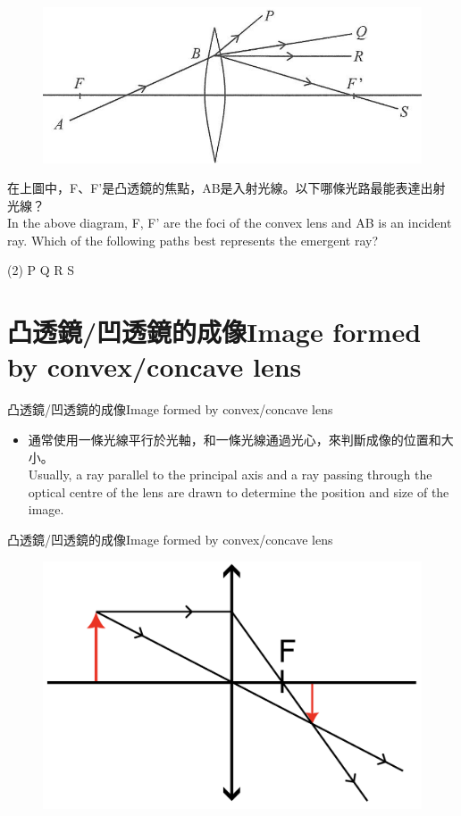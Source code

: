 \documentclass[beamer=true]{standalone}
\begin{document}
\begin{eg}
    \begin{figure}
        \centering
        \includegraphics[width=0.6\linewidth]{assets/xn1e98u89.png}


    \end{figure}
    在上圖中，F、F'是凸透鏡的焦點，AB是入射光線。以下哪條光路最能表達出射光線？\\In the above diagram, F, F' are the foci of the convex lens and AB is an incident ray. Which of the following paths best represents the emergent ray?
    \begin{tasks}
        (2)
        \task P
        \task Q
        \task R
        \task S
    \end{tasks}
\end{eg}

\section{凸透鏡/凹透鏡的成像Image formed by convex/concave lens}

\begin{frame}{凸透鏡/凹透鏡的成像Image formed by convex/concave lens}
    \begin{itemize}
        \item 通常使用一條光線平行於光軸，和一條光線通過光心，來判斷成像的位置和大小。\\Usually, a ray parallel to the principal axis and a ray passing through the optical centre of the lens are drawn to determine the position and size of the image.
    \end{itemize}

\end{frame}

\begin{frame}{凸透鏡/凹透鏡的成像Image formed by convex/concave lens}
    \begin{figure}
        \centering
        \includegraphics[width=0.75\linewidth]{assets/qxnuue8r923ge.png}


    \end{figure}

\end{frame}
\end{document}
